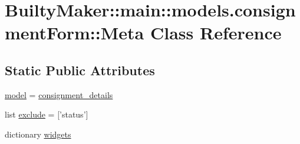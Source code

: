 \hypertarget{classBuiltyMaker_1_1main_1_1models_1_1consignmentForm_1_1Meta}{\section{\-Builty\-Maker\-:\-:main\-:\-:models.\-consignment\-Form\-:\-:\-Meta \-Class \-Reference}
\label{classBuiltyMaker_1_1main_1_1models_1_1consignmentForm_1_1Meta}
}
\subsection*{\-Static \-Public \-Attributes}
\begin{DoxyCompactItemize}
\item 
\hyperlink{classBuiltyMaker_1_1main_1_1models_1_1consignmentForm_1_1Meta_ac1611abc444d3d8409aaa6fe0010e6ef}{model} = \hyperlink{classBuiltyMaker_1_1main_1_1models_1_1consignment__details}{consignment\-\_\-details}
\item 
list \hyperlink{classBuiltyMaker_1_1main_1_1models_1_1consignmentForm_1_1Meta_aac243b8d517a1ea6bbcf868bdd379e75}{exclude} = \mbox{[}'status'\mbox{]}
\item 
dictionary \hyperlink{classBuiltyMaker_1_1main_1_1models_1_1consignmentForm_1_1Meta_a715dd4323891b717ce1afa252d2e71b4}{widgets}
\end{DoxyCompactItemize}


